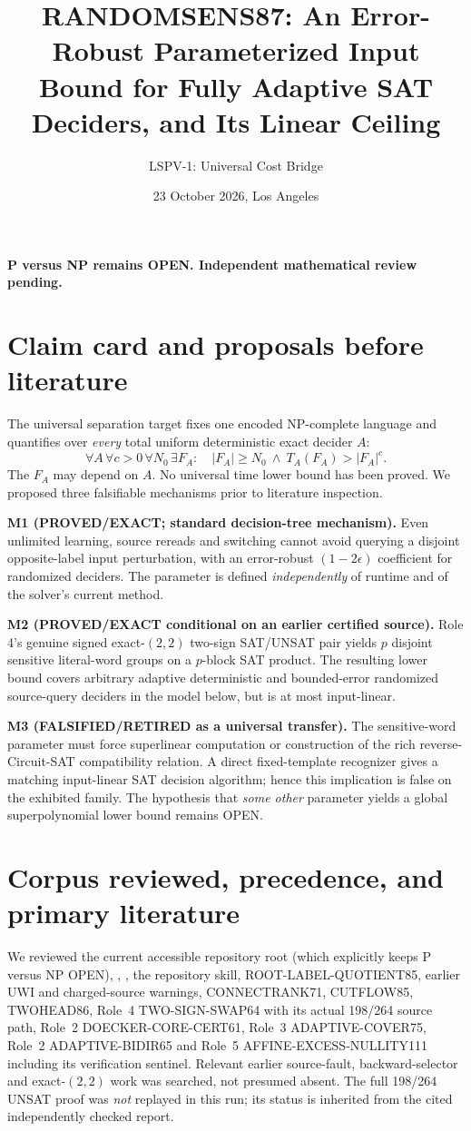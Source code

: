 \documentclass[11pt]{article}
\title{RANDOMSENS87: An Error-Robust Parameterized Input Bound for Fully Adaptive SAT Deciders, and Its Linear Ceiling}
\author{LSPV-1: Universal Cost Bridge}
\date{23 October 2026, Los Angeles}
\begin{document}
\maketitle
\begin{center}
\textbf{P versus NP remains OPEN. Independent mathematical review pending.}
\end{center}
\section{Claim card and proposals before literature}
The universal separation target fixes one encoded NP-complete language and quantifies over \emph{every} total uniform deterministic exact decider $A$:
\[
\forall A\,\forall c>0\,\forall N_0\,\exists F_A:\quad
|F_A|\ge N_0\ \land\ T_A(F_A)>|F_A|^c.
\]
The $F_A$ may depend on $A$. No universal time lower bound has been proved.
We proposed three falsifiable mechanisms prior to literature inspection.

\noindent\textbf{M1 (PROVED/EXACT; standard decision-tree mechanism).}
Even unlimited learning, source rereads and switching cannot avoid querying a disjoint opposite-label input perturbation, with an error-robust $(1-2\epsilon)$ coefficient for randomized deciders. The parameter is defined \emph{independently} of runtime and of the solver's current method.

\noindent\textbf{M2 (PROVED/EXACT conditional on an earlier certified source).}
Role 4's genuine signed exact-$(2,2)$ two-sign SAT/UNSAT pair yields $p$ disjoint sensitive literal-word groups on a $p$-block SAT product. The resulting lower bound covers arbitrary adaptive deterministic and bounded-error randomized source-query deciders in the model below, but is at most input-linear.

\noindent\textbf{M3 (FALSIFIED/RETIRED as a universal transfer).}
The sensitive-word parameter must force superlinear computation or construction of the rich reverse-Circuit-SAT compatibility relation. A direct fixed-template recognizer gives a matching input-linear SAT decision algorithm; hence this implication is false on the exhibited family. The hypothesis that \emph{some other} parameter yields a global superpolynomial lower bound remains OPEN.

\section{Corpus reviewed, precedence, and primary literature}
We reviewed the current accessible repository root  (which explicitly keeps P versus NP OPEN), , , the repository  skill, ROOT-LABEL-QUOTIENT85, earlier UWI and charged-source warnings, CONNECTRANK71, CUTFLOW85, TWOHEAD86, Role~4 TWO-SIGN-SWAP64 with its actual 198/264 source path, Role~2 DOECKER-CORE-CERT61, Role~3 ADAPTIVE-COVER75, Role~2 ADAPTIVE-BIDIR65 and Role~5 AFFINE-EXCESS-NULLITY111 including its verification sentinel. Relevant earlier source-fault, backward-selector and exact-$(2,2)$ work was searched, not presumed absent. The full 198/264 UNSAT proof was \emph{not} replayed in this run; its status is inherited from the cited independently checked report.
\end{document}
